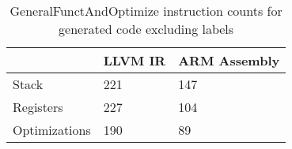\begin{table}[h!]
\centering
\begin{tabular}{p{}p{}p{}}
  \hline
 & LLVM IR & ARM Assembly \\ 
  \hline
Stack & 221 & 147 \\ 
  Registers & 227 & 104 \\ 
  Optimizations & 190 &  89 \\ 
   \hline
\end{tabular}
\caption{GeneralFunctAndOptimize instruction counts for generated code excluding labels}
\end{table}
